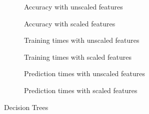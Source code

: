 \begin{figure}[!htb]
    \centering
    \begin{subfigure}[htb]{0.49\textwidth}
        \centering
        
        \caption{Accuracy with unscaled features}
        \label{fig:dtc_accs}
    \end{subfigure}
    \begin{subfigure}[htb]{0.49\textwidth}
        \centering
        
        \caption{Accuracy with scaled features}
        \label{fig:dtc_accs_scaled}
    \end{subfigure}
    \begin{subfigure}[htb]{0.49\textwidth}
        \centering
        
        \caption{Training times with unscaled features}
        \label{fig:dtc_fit_times}
    \end{subfigure}
    \begin{subfigure}[htb]{0.49\textwidth}
        \centering
        
        \caption{Training times with scaled features}
        \label{fig:dtc_fit_times_scaled}
    \end{subfigure}
    \begin{subfigure}[htb]{0.49\textwidth}
        \centering
        
        \caption{Prediction times with unscaled features}
        \label{fig:dtc_pred_times}
    \end{subfigure}
    \begin{subfigure}[htb]{0.49\textwidth}
        \centering
        
        \caption{Prediction times with scaled features}
        \label{fig:dtc_pred_times_scaled}
    \end{subfigure}
    \caption{Decision Trees}
    \label{fig:dtc}
\end{figure}

